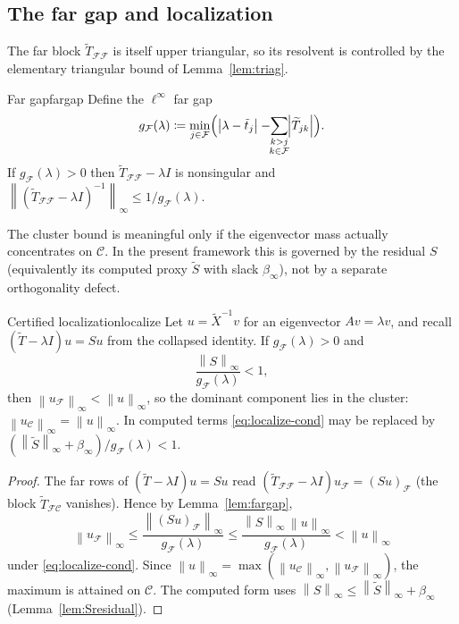 \documentclass[11pt, a4paper]{article}
\numberwithin{equation}{section}
\newcommand{\norm}[1]{\left\|#1\right\|}
\newcommand{\abs}[1]{\left|#1\right|}
\newcommand{\tX}{\widetilde{X}}
\newcommand{\tT}{\widetilde{T}}
\begin{document}
\subsection{The far gap and localization}

The far block $\tT_{\mathcal{F}\mathcal{F}}$ is itself upper triangular, so its
resolvent is controlled by the elementary triangular bound of
Lemma~\ref{lem:triag}.

\begin{lemma}{Far gap}{fargap}
  Define the $\ell^\infty$ far gap
  \[
    g_{\mathcal{F}}(\lambda) \coloneqq \min_{j\in\mathcal{F}}
      \Bigl(\abs{\lambda - \tilde t_j} - \!\!\sum_{\substack{k>j\\ k\in\mathcal{F}}}\!\!\abs{\tT_{jk}}\Bigr).
  \]
  If $g_{\mathcal{F}}(\lambda) > 0$ then $\tT_{\mathcal{F}\mathcal{F}} - \lambda
  I$ is nonsingular and $\norm{(\tT_{\mathcal{F}\mathcal{F}} - \lambda
  I)^{-1}}_\infty \le 1/g_{\mathcal{F}}(\lambda)$.
\end{lemma}

The cluster bound is meaningful only if the eigenvector mass actually
concentrates on $\mathcal{C}$.  In the present framework this is governed by the
residual $S$ (equivalently its computed proxy $\tilde S$ with slack
$\beta_\infty$), not by a separate orthogonality defect.

\begin{lemma}{Certified localization}{localize}
  Let $u = \tX^{-1}v$ for an eigenvector $Av = \lambda v$, and recall $(\tT -
  \lambda I)u = Su$ from the collapsed identity.  If $g_{\mathcal{F}}(\lambda) >
  0$ and
  \begin{equation}\label{eq:localize-cond}
    \frac{\norm{S}_\infty}{g_{\mathcal{F}}(\lambda)} < 1,
  \end{equation}
  then $\norm{u_{\mathcal{F}}}_\infty < \norm{u}_\infty$, so the dominant
  component lies in the cluster: $\norm{u_{\mathcal{C}}}_\infty =
  \norm{u}_\infty$.  In computed terms \eqref{eq:localize-cond} may be replaced
  by $(\norm{\tilde S}_\infty + \beta_\infty)/g_{\mathcal{F}}(\lambda) < 1$.
\end{lemma}

\begin{proof}
The far rows of $(\tT - \lambda I)u = Su$ read $(\tT_{\mathcal{F}\mathcal{F}} -
\lambda I)u_{\mathcal{F}} = (Su)_{\mathcal{F}}$ (the block $\tT_{\mathcal{F}
\mathcal{C}}$ vanishes).  Hence by Lemma~\ref{lem:fargap},
\[
  \norm{u_{\mathcal{F}}}_\infty
    \le \frac{\norm{(Su)_{\mathcal{F}}}_\infty}{g_{\mathcal{F}}(\lambda)}
    \le \frac{\norm{S}_\infty\,\norm{u}_\infty}{g_{\mathcal{F}}(\lambda)}
    < \norm{u}_\infty
\]
under \eqref{eq:localize-cond}.  Since $\norm{u}_\infty =
\max(\norm{u_{\mathcal{C}}}_\infty, \norm{u_{\mathcal{F}}}_\infty)$, the maximum
is attained on $\mathcal{C}$.  The computed form uses $\norm{S}_\infty \le
\norm{\tilde S}_\infty + \beta_\infty$ (Lemma~\ref{lem:Sresidual}).
\end{proof}
\end{document}
